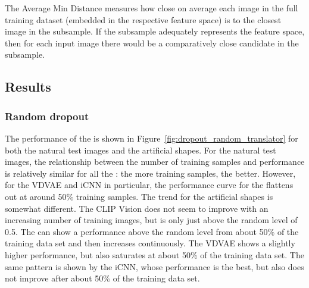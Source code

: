 The Average Min Distance measures how close on average each image in the full training dataset (embedded in the respective feature space) is to the closest image in the subsample. If the subsample adequately represents the feature space, then for each input image there would be a comparatively close candidate in the subsample. 

\subsection{Results}



\subsubsection{Random dropout}
The performance of the  is shown in Figure~\ref{fig:dropout_random_translator} for both the natural test images and the artificial shapes. For the natural test images, the relationship between the number of training samples and performance is relatively similar for all the : the more training samples, the better. However, for the VDVAE and iCNN in particular, the performance curve for the  flattens out at around 50\% training samples. The trend for the artificial shapes is somewhat different. The CLIP Vision  does not seem to improve with an increasing number of training images, but is only just above the random level of 0.5. The   can show a performance above the random level from about 50\% of the training data set and then increases continuously. The VDVAE  shows a slightly higher performance, but also saturates at about 50\% of the training data set. The same pattern is shown by the iCNN, whose performance is the best, but also does not improve after about 50\% of the training data set. 

